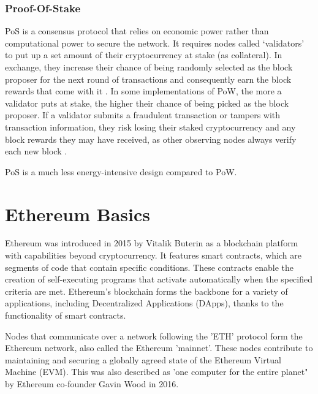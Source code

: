 
\subsubsection{Proof-Of-Stake}

PoS is a consensus protocol that relies on economic power rather than computational power to secure the network. It requires nodes called ‘validators’ to put up a set amount of their cryptocurrency at stake (as collateral). In exchange, they increase their chance of being randomly selected as the block proposer for the next round of transactions and consequently earn the block rewards that come with it \cite{King2012PPCoin:Proof-of-Stake}. In some implementations of PoW, the more a validator puts at stake, the higher their chance of being picked as the block proposer. If a validator submits a fraudulent transaction or tampers with transaction information, they risk losing their staked cryptocurrency and any block rewards they may have received, as other observing nodes always verify each new block \cite{Napoletano2022WhatAdvisor}. 

PoS is a much less energy-intensive design compared to PoW.



\section{Ethereum Basics}

Ethereum was introduced in 2015 by Vitalik Buterin as a blockchain platform with capabilities beyond cryptocurrency. It features smart contracts, which are segments of code that contain specific conditions. These contracts enable the creation of self-executing programs that activate automatically when the specified criteria are met. Ethereum's blockchain forms the backbone for a variety of applications, including Decentralized Applications (DApps), thanks to the functionality of smart contracts.

Nodes that communicate over a network following the 'ETH' protocol form the Ethereum network, also called the Ethereum 'mainnet'. These nodes contribute to maintaining and securing a globally agreed state of the Ethereum Virtual Machine (EVM). This was also described as 'one computer for the entire planet" by Ethereum co-founder Gavin Wood in 2016\cite{Ethereum:Industries}. 

